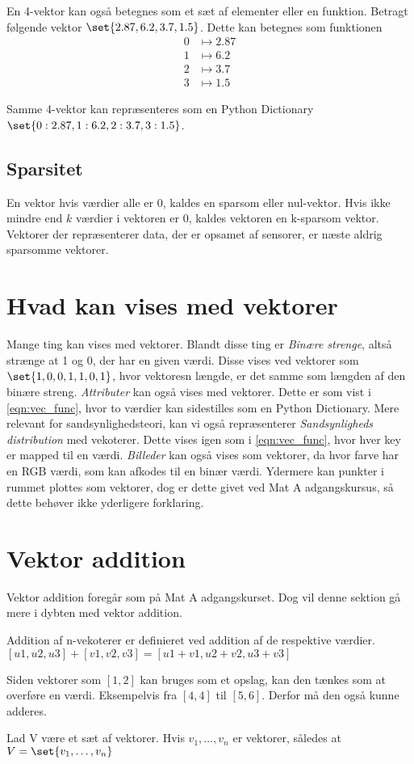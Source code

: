 En 4-vektor kan også betegnes som et sæt af elementer eller en funktion. Betragt følgende vektor $\set{2.87,6.2,3.7,1.5}$. Dette kan betegnes som funktionen
\begin{align}
	\label{eqn:vec_func}
	0&\mapsto 2.87\\
	1&\mapsto 6.2\\
	2&\mapsto 3.7\\
	3&\mapsto 1.5
\end{align}

Samme 4-vektor kan repræsenteres som en Python Dictionary $\set{0:2.87, 1:6.2, 2:3.7, 3:1.5}$.

\subsection{Sparsitet}
En vektor hvis værdier alle er 0, kaldes en sparsom eller nul-vektor. Hvis ikke mindre end $k$ værdier i vektoren er 0, kaldes vektoren en k-sparsom vektor. Vektorer der repræsenterer data, der er opsamet af sensorer, er næste aldrig sparsomme vektorer.

\section{Hvad kan vises med vektorer}
Mange ting kan vises med vektorer. Blandt disse ting er \emph{Binære strenge}, altså strænge at 1 og 0, der har en given værdi. Disse vises ved vektorer som $\set{1,0,0,1,1,0,1}$, hvor vektoresn længde, er det samme som længden af den binære streng. \emph{Attributer} kan også vises med vektorer. Dette er som vist i \cref{eqn:vec_func}, hvor to værdier kan sidestilles som en Python Dictionary. Mere relevant for sandsynlighedsteori, kan vi også repræsenterer \emph{Sandsynligheds distribution} med vekoterer. Dette vises igen som i \cref{eqn:vec_func}, hvor hver key er mapped til en værdi. \emph{Billeder} kan også vises som vektorer, da hvor farve har en RGB værdi, som kan afkodes til en binær værdi. Ydermere kan punkter i rummet plottes som vektorer, dog er dette givet ved Mat A adgangskursus, så dette behøver ikke yderligere forklaring.

\section{Vektor addition}
Vektor addition foregår som på Mat A adgangskurset. Dog vil denne sektion gå mere i dybten med vektor addition. 

\begin{frdef}[KLEIN s. 69]
	Addition af n-vekoterer er definieret ved addition af de respektive værdier.
	$[u1,u2,u3] + [v1,v2,v3] = [u1+v1, u2+v2, u3+v3]$
\end{frdef}

Siden vektorer som $[1,2]$ kan bruges som et opslag, kan den tænkes som at overføre en værdi. Eksempelvis fra $[4,4]$ til $[5,6]$. Derfor må den også kunne adderes.

\begin{frdef}
	Lad V være et sæt af vektorer. Hvis $v_1,\dots,v_n$ er vektorer, således at $V=\set{v_1,\dots,v_n}$
\end{frdef}